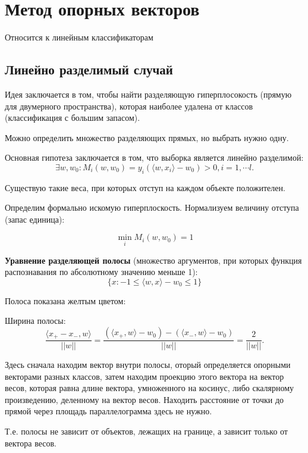 \section{Метод опорных векторов}

Относится к линейным классификаторам


\subsection{Линейно разделимый случай}

Идея заключается в том, чтобы найти разделяющую
гиперплосокость (прямую для двумерного пространства), которая наиболее удалена
от классов (классификация с большим запасом).

Можно определить множество разделяющих прямых, но выбрать нужно одну.


Основная гипотеза заключается в том, что выборка является линейно разделимой:
\[
    \exists w, w_0 : M_i(w, w_0) = y_i(\langle w, x_i \rangle - w_0) > 0, i =
    1, \cdots l.
\]

Существую такие веса, при которых отступ на каждом объекте положителен.

Определим формально искомую гиперплоскость. Нормализуем величину отступа (запас
единица):

\[
    \min_i M_i(w, w_0) = 1
\]

\textbf{Уравнение разделяющей полосы} (множество аргументов, при которых
функция распознавания по абсолютному значению меньше 1):
\[
    \{ x: -1 \leq \langle w, x \rangle - w_0 \leq 1 \}
\]

Полоса показана желтым цветом:


Ширина полосы:
\[
    \frac{\langle x_+ - x_-, w \rangle}{||w||} = \frac{(\langle x_+, w\rangle -
    w_0) - (\langle x_-, w \rangle - w_0)}{||w||} = \frac{2}{||w||}.
\]

Здесь сначала находим вектор внутри полосы, оторый определяется опорными векторами
разных классов, затем находим проекцию этого вектора на вектор весов, которая
равна длине вектора, умноженного на косинус, либо скалярному произведению,
деленному на вектор весов. Находить расстояние от точки до прямой через площадь
параллелограмма здесь не нужно.

Т.е. полосы не зависит от объектов, лежащих на границе, а зависит только от
вектора весов.

